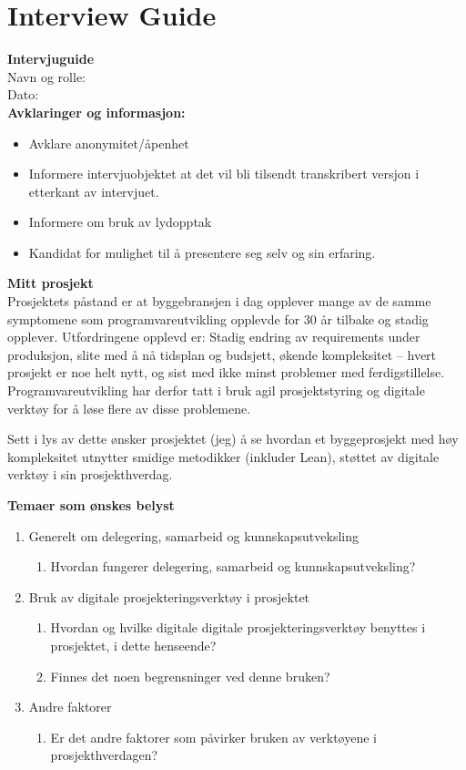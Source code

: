 \chapter{Interview Guide} \label{apx:interview_guide}
\noindent\textbf{Intervjuguide} \\
Navn og rolle: \\
Dato: \\

\noindent\textbf{Avklaringer og informasjon:} 
\begin{itemize}
    \item Avklare anonymitet/åpenhet
    \item Informere intervjuobjektet at det vil bli tilsendt transkribert versjon i etterkant av intervjuet.
    \item Informere om bruk av lydopptak
    \item Kandidat for mulighet til å presentere seg selv og sin erfaring.
\end{itemize}

\noindent\textbf{Mitt prosjekt} \\
Prosjektets påstand er at byggebransjen i dag opplever mange av de samme symptomene som programvareutvikling opplevde for 30 år tilbake og stadig opplever. Utfordringene opplevd er: Stadig endring av requirements under produksjon, slite med å nå tidsplan og budsjett, økende kompleksitet – hvert prosjekt er noe helt nytt, og sist med ikke minst problemer med ferdigstillelse. Programvareutvikling har derfor tatt i bruk agil prosjektstyring og digitale verktøy for å løse flere av disse problemene.

Sett i lys av dette ønsker prosjektet (jeg) å se hvordan et byggeprosjekt med høy kompleksitet utnytter smidige metodikker (inkluder Lean), støttet av digitale verktøy i sin prosjekthverdag. \\

\pagebreak

\noindent\textbf{Temaer som ønskes belyst}
\begin{enumerate}
    \item Generelt om delegering, samarbeid og kunnskapsutveksling
    \begin{enumerate}
        \item Hvordan fungerer delegering, samarbeid og kunnskapsutveksling?
    \end{enumerate}
    \item Bruk av digitale prosjekteringsverktøy i prosjektet
    \begin{enumerate}
        \item Hvordan og hvilke digitale digitale prosjekteringsverktøy benyttes i\\ prosjektet, i dette henseende?
        \item Finnes det noen begrensninger ved denne bruken?
    \end{enumerate}
    \item Andre faktorer
    \begin{enumerate}
        \item Er det andre faktorer som påvirker bruken av verktøyene i prosjekthverdagen?
    \end{enumerate}
\end{enumerate}